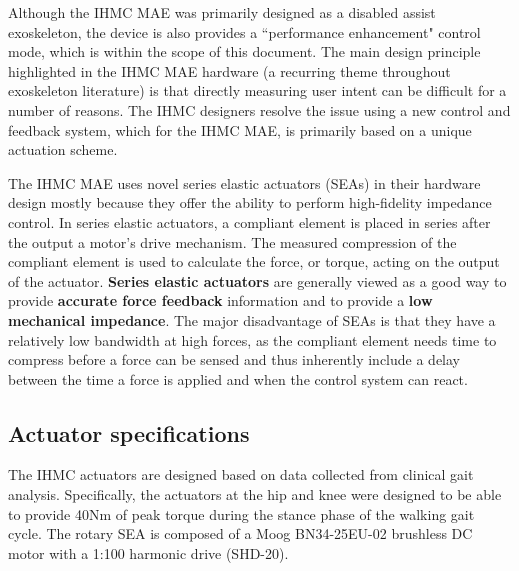 \begin{refsection}

Although the IHMC MAE was primarily designed as a disabled assist exoskeleton, the device is also provides a ``performance enhancement" control mode, which is within the scope of this document.  The main design principle highlighted in the IHMC MAE hardware (a recurring theme throughout exoskeleton literature) is that directly measuring user intent can be difficult for a number of reasons.  The IHMC designers resolve the issue using a new control and feedback system, which for the IHMC MAE, is primarily based on a unique actuation scheme. 

The IHMC MAE uses novel series elastic actuators (SEAs) in their hardware design mostly because they offer the ability to perform high-fidelity impedance control.  In series elastic actuators, a compliant element is placed in series after the output a motor's drive mechanism. The measured compression of the compliant element is used to calculate the force, or torque, acting on the output of the actuator.  { \bf Series elastic actuators} are generally viewed as a good way to provide {\bf accurate force feedback} information and to provide a {\bf low mechanical impedance}.  The major disadvantage of SEAs is that they have a relatively low bandwidth at high forces, as the compliant element needs time to compress before a force can be sensed and thus inherently include a delay between the time a force is applied and when the control system can react.


\subsection{Actuator specifications}

The IHMC actuators are designed based on data collected from clinical gait analysis.  Specifically, the actuators at the hip and knee were designed to be able to provide 40Nm of peak torque during the stance phase of the walking gait cycle.  The rotary SEA is composed of a Moog BN34-25EU-02 brushless DC motor with a 1:100 harmonic drive (SHD-20).  
 

\end{refsection}
